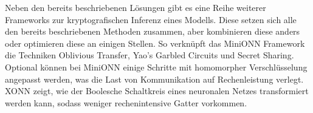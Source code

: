Neben den bereits beschriebenen Lösungen gibt es eine Reihe weiterer Frameworks zur kryptografischen Inferenz eines Modells. 
Diese setzen sich alle den bereits beschriebenen Methoden zusammen, aber kombinieren diese anders oder optimieren diese an einigen Stellen.
So verknüpft das MiniONN Framework \cite{P-59} die Techniken Oblivious Transfer, Yao's Garbled Circuits und Secret Sharing. 
Optional können bei MiniONN einige Schritte mit homomorpher Verschlüsselung angepasst werden, was die Last von Kommunikation auf Rechenleistung verlegt.
XONN \cite{P-106} zeigt, wie der Boolesche Schaltkreis eines neuronalen Netzes transformiert werden kann, sodass weniger rechenintensive Gatter vorkommen.
